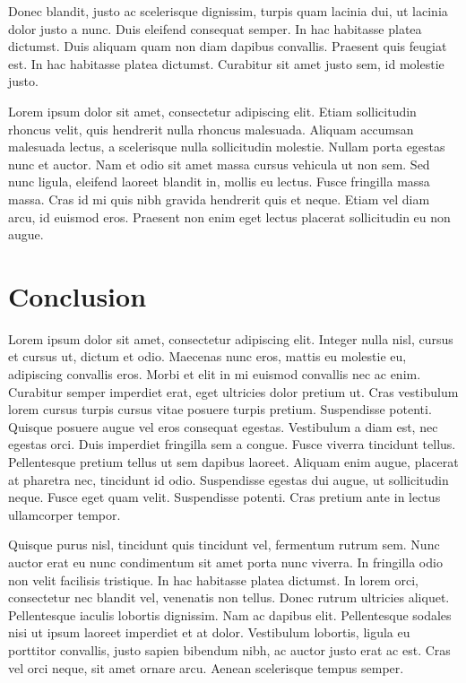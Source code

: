 \documentclass[12pt,lot,lof]{quthesis}
\begin{document}
Donec blandit, justo ac scelerisque dignissim, turpis quam lacinia dui, ut lacinia dolor justo a nunc. Duis eleifend consequat semper. In hac habitasse platea dictumst. Duis aliquam quam non diam dapibus convallis. Praesent quis feugiat est. In hac habitasse platea dictumst. Curabitur sit amet justo sem, id molestie justo.

Lorem ipsum dolor sit amet, consectetur adipiscing elit. Etiam sollicitudin rhoncus velit, quis hendrerit nulla rhoncus malesuada. Aliquam accumsan malesuada lectus, a scelerisque nulla sollicitudin molestie. Nullam porta egestas nunc et auctor. Nam et odio sit amet massa cursus vehicula ut non sem. Sed nunc ligula, eleifend laoreet blandit in, mollis eu lectus. Fusce fringilla massa massa. Cras id mi quis nibh gravida hendrerit quis et neque. Etiam vel diam arcu, id euismod eros. Praesent non enim eget lectus placerat sollicitudin eu non augue.

\chapter{Conclusion}
Lorem ipsum dolor sit amet, consectetur adipiscing elit. Integer nulla nisl, cursus et cursus ut, dictum et odio. Maecenas nunc eros, mattis eu molestie eu, adipiscing convallis eros. Morbi et elit in mi euismod convallis nec ac enim. Curabitur semper imperdiet erat, eget ultricies dolor pretium ut. Cras vestibulum lorem cursus turpis cursus vitae posuere turpis pretium. Suspendisse potenti. Quisque posuere augue vel eros consequat egestas. Vestibulum a diam est, nec egestas orci. Duis imperdiet fringilla sem a congue. Fusce viverra tincidunt tellus. Pellentesque pretium tellus ut sem dapibus laoreet. Aliquam enim augue, placerat at pharetra nec, tincidunt id odio. Suspendisse egestas dui augue, ut sollicitudin neque. Fusce eget quam velit. Suspendisse potenti. Cras pretium ante in lectus ullamcorper tempor.

Quisque purus nisl, tincidunt quis tincidunt vel, fermentum rutrum sem. Nunc auctor erat eu nunc condimentum sit amet porta nunc viverra. In fringilla odio non velit facilisis tristique. In hac habitasse platea dictumst. In lorem orci, consectetur nec blandit vel, venenatis non tellus. Donec rutrum ultricies aliquet. Pellentesque iaculis lobortis dignissim. Nam ac dapibus elit. Pellentesque sodales nisi ut ipsum laoreet imperdiet et at dolor. Vestibulum lobortis, ligula eu porttitor convallis, justo sapien bibendum nibh, ac auctor justo erat ac est. Cras vel orci neque, sit amet ornare arcu. Aenean scelerisque tempus semper.
\end{document}
